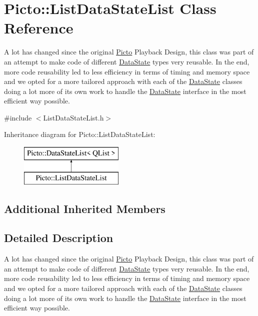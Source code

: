 \hypertarget{class_picto_1_1_list_data_state_list}{\section{Picto\-:\-:List\-Data\-State\-List Class Reference}
\label{class_picto_1_1_list_data_state_list}
}


A lot has changed since the original \hyperlink{namespace_picto}{Picto} Playback Design, this class was part of an attempt to make code of different \hyperlink{class_picto_1_1_data_state}{Data\-State} types very reusable. In the end, more code reusability led to less efficiency in terms of timing and memory space and we opted for a more tailored approach with each of the \hyperlink{class_picto_1_1_data_state}{Data\-State} classes doing a lot more of its own work to handle the \hyperlink{class_picto_1_1_data_state}{Data\-State} interface in the most efficient way possible.  




{\ttfamily \#include $<$List\-Data\-State\-List.\-h$>$}

Inheritance diagram for Picto\-:\-:List\-Data\-State\-List\-:\begin{figure}[H]
\begin{center}
\leavevmode
\includegraphics[height=2.000000cm]{class_picto_1_1_list_data_state_list}
\end{center}
\end{figure}
\subsection*{Additional Inherited Members}


\subsection{Detailed Description}
A lot has changed since the original \hyperlink{namespace_picto}{Picto} Playback Design, this class was part of an attempt to make code of different \hyperlink{class_picto_1_1_data_state}{Data\-State} types very reusable. In the end, more code reusability led to less efficiency in terms of timing and memory space and we opted for a more tailored approach with each of the \hyperlink{class_picto_1_1_data_state}{Data\-State} classes doing a lot more of its own work to handle the \hyperlink{class_picto_1_1_data_state}{Data\-State} interface in the most efficient way possible. 

